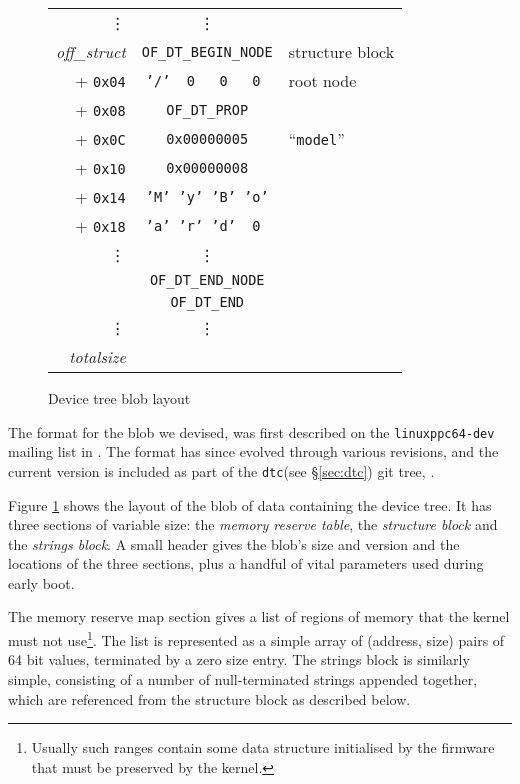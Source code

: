 \documentclass[a4paper,twocolumn]{article}
\newcommand{\dtbeginnode}{\texttt{OF\_DT\_BEGIN\_NODE\xspace}}
\newcommand{\dtendnode}{\texttt{OF\_DT\_END\_NODE\xspace}}
\newcommand{\dtprop}{\texttt{OF\_DT\_PROP\xspace}}
\newcommand{\dtend}{\texttt{OF\_DT\_END\xspace}}
\newcommand{\dtc}{\texttt{dtc}\xspace}
\begin{document}
\begin{figure}[htb!]
\begin{tabular}{r|c|l}
    \multicolumn{1}{r}{\vdots} & \multicolumn{1}{c}{\vdots} & \\\cline{2-2}
    \emph{off\_struct} & \dtbeginnode & structure block \\\cline{2-2}
    + \texttt{0x04} & \texttt{'/' ~0~ ~0~ ~0~}  & root node\\\cline{2-2}
    + \texttt{0x08} & \dtprop & \\\cline{2-2}
    + \texttt{0x0C} & \texttt{0x00000005} & ``\texttt{model}''\\\cline{2-2}
    + \texttt{0x10} & \texttt{0x00000008} & \\\cline{2-2}
    + \texttt{0x14} & \texttt{'M' 'y' 'B' 'o'} & \\
    + \texttt{0x18} & \texttt{'a' 'r' 'd' ~0~} & \\\cline{2-2}
    \vdots & \multicolumn{1}{c|}{\vdots} & \\\cline{2-2}
    & \texttt{\dtendnode} \\\cline{2-2}
    & \texttt{\dtend} \\\cline{2-2}
    \multicolumn{1}{r}{\vdots} & \multicolumn{1}{c}{\vdots} & \\\cline{2-2}
    \multicolumn{1}{r}{\emph{totalsize}} \\
  \end{tabular}
  \caption{Device tree blob layout}
  \label{fig:blob-layout}
\end{figure}

The format for the blob we devised, was first described on the
\texttt{linuxppc64-dev} mailing list in \cite{noof1}.  The format has
since evolved through various revisions, and the current version is
included as part of the \dtc (see \S\ref{sec:dtc}) git tree,
\cite{dtcgit}.

Figure \ref{fig:blob-layout} shows the layout of the blob of data
containing the device tree.  It has three sections of variable size:
the \emph{memory reserve table}, the \emph{structure block} and the
\emph{strings block}.  A small header gives the blob's size and
version and the locations of the three sections, plus a handful of
vital parameters used during early boot.

The memory reserve map section gives a list of regions of memory that
the kernel must not use\footnote{Usually such ranges contain some data
structure initialised by the firmware that must be preserved by the
kernel.}.  The list is represented as a simple array of (address,
size) pairs of 64 bit values, terminated by a zero size entry.  The
strings block is similarly simple, consisting of a number of
null-terminated strings appended together, which are referenced from
the structure block as described below.
\end{document}
